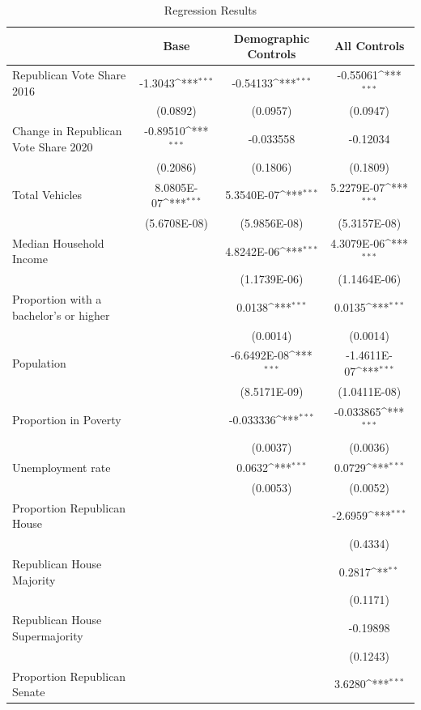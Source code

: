 \documentclass{article}
\begin{document}
\begin{table}[ht]
\caption {Regression Results} \label{tab:title}

\begin{adjustbox}{max width=\textwidth}
\centering
{
\def\sym#1{\ifmmode^{#1}\else\(^{#1}\)\fi}
\begin{tabular}{@{\extracolsep{2pt}}l*{3}{c}@{}}
\hline\hline

 & Base & Demographic Controls & All Controls \\
\hline
Republican Vote Share 2016 & -1.3043\sym{***} & -0.54133\sym{***} & -0.55061\sym{***} \\
 & (0.0892) & (0.0957) & (0.0947) \\
Change in Republican Vote Share 2020 & -0.89510\sym{***} & -0.033558 & -0.12034 \\
 & (0.2086) & (0.1806) & (0.1809) \\
Total Vehicles & 8.0805E-07\sym{***} & 5.3540E-07\sym{***} & 5.2279E-07\sym{***} \\
 & (5.6708E-08) & (5.9856E-08) & (5.3157E-08) \\
Median Household Income &  & 4.8242E-06\sym{***} & 4.3079E-06\sym{***} \\
 &  & (1.1739E-06) & (1.1464E-06) \\
Proportion with a bachelor's or higher &  & 0.0138\sym{***} & 0.0135\sym{***} \\
 &  & (0.0014) & (0.0014) \\
Population &  & -6.6492E-08\sym{***} & -1.4611E-07\sym{***} \\
 &  & (8.5171E-09) & (1.0411E-08) \\
Proportion in Poverty &  & -0.033336\sym{***} & -0.033865\sym{***} \\
 &  & (0.0037) & (0.0036) \\
Unemployment rate &  & 0.0632\sym{***} & 0.0729\sym{***} \\
 &  & (0.0053) & (0.0052) \\
Proportion Republican House &  &  & -2.6959\sym{***} \\
 &  &  & (0.4334) \\
Republican House Majority &  &  & 0.2817\sym{**} \\
 &  &  & (0.1171) \\
Republican House Supermajority &  &  & -0.19898 \\
 &  &  & (0.1243) \\
Proportion Republican Senate &  &  & 3.6280\sym{***} \\

\end{tabular}}
\end{adjustbox}
\end{table}
\end{document}
